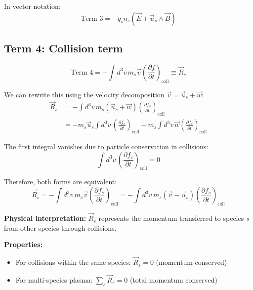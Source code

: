 In vector notation:
\begin{equation*}
\text{Term 3} = -q_s n_s (\vec{E} + \vec{u}_s \wedge \vec{B})
\end{equation*}

\subsection{Term 4: Collision term}

\begin{equation*}
\text{Term 4} = -\int d^3v \, m_s \vec{v} \left(\frac{\partial f}{\partial t}\right)_{\text{coll}} \equiv \vec{R}_s
\end{equation*}

We can rewrite this using the velocity decomposition $\vec{v} = \vec{u}_s + \vec{w}$:
\begin{align*}
\vec{R}_s &= -\int d^3v \, m_s (\vec{u}_s + \vec{w}) \left(\frac{\partial f_s}{\partial t}\right)_{\text{coll}}  \\
&= -m_s \vec{u}_s \int d^3v \, \left(\frac{\partial f_s}{\partial t}\right)_{\text{coll}} - m_s \int d^3v \, \vec{w} \left(\frac{\partial f_s}{\partial t}\right)_{\text{coll}}
\end{align*}

The first integral vanishes due to particle conservation in collisions:
\begin{equation*}
\int d^3v \, \left(\frac{\partial f_s}{\partial t}\right)_{\text{coll}} = 0
\end{equation*}

Therefore, both forms are equivalent:
\begin{equation*}
\boxed{\vec{R}_s = -\int d^3v \, m_s \vec{v} \left(\frac{\partial f_s}{\partial t}\right)_{\text{coll}} = -\int d^3v \, m_s (\vec{v} - \vec{u}_s) \left(\frac{\partial f_s}{\partial t}\right)_{\text{coll}}}
\end{equation*}

\textbf{Physical interpretation:} $\vec{R}_s$ represents the momentum transferred to species $s$ from other species through collisions.

\textbf{Properties:}
\begin{itemize}
\item For collisions within the same species: $\vec{R}_s = 0$ (momentum conserved)
\item For multi-species plasma: $\sum_s \vec{R}_s = 0$ (total momentum conserved)
\end{itemize}

